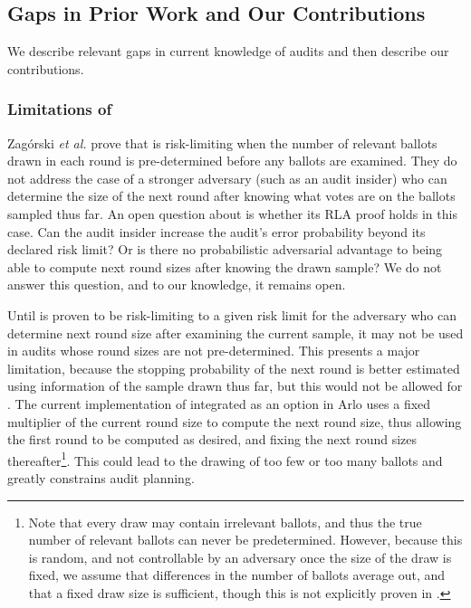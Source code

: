 
\subsection{Gaps in Prior Work and Our Contributions}
We describe relevant gaps in current knowledge of audits and then describe our contributions. 
\subsubsection{Limitations of \Minerva}
Zag\'{o}rski {\em et al.}  prove that \Minerva \cite{usenix_minerva} is risk-limiting when the number of relevant ballots drawn in each round is pre-determined before any ballots are examined. They do not address the case of a stronger adversary (such as an audit insider) who can determine the size of the next round after knowing what votes are on the ballots sampled thus far. An open question about \Minerva is whether its RLA proof holds in this case. Can the audit insider increase the audit's error probability beyond its declared risk limit? Or is there no probabilistic adversarial advantage to being able to compute next round sizes after knowing the drawn sample? We do not answer this question, and to our knowledge, it remains open. 

Until \Minerva is proven to be risk-limiting to a given risk limit for the adversary who can determine next round size after examining the current sample, it may not be used in audits whose round sizes are not pre-determined. This presents a major limitation, because the stopping probability of the next round is better estimated using information of the sample drawn thus far, but this would not be allowed for \Minerva. The current implementation of \Minerva integrated as an option in Arlo uses a fixed multiplier of the current round size to compute the next round size, thus allowing the first round to be computed as desired, and fixing the next round sizes thereafter\footnote{Note that every draw may contain irrelevant ballots, and thus the true number of relevant ballots can never be predetermined. However, because this is random, and not controllable by an adversary once the size of the draw is fixed, we assume that differences in the number of ballots average out, and that a fixed draw size is sufficient, though this is not explicitly proven in \cite{usenix_minerva}.}. This could lead to the drawing of too few or too many ballots and greatly constrains audit planning.  

